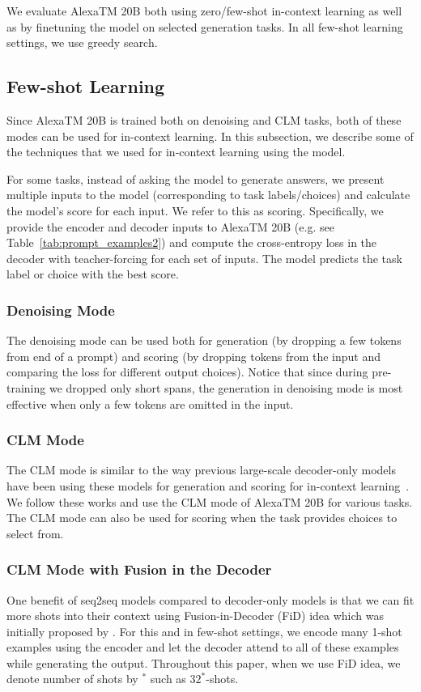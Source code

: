 We evaluate {AlexaTM 20B} both using zero/few-shot in-context learning as well as by finetuning the model on selected generation tasks. In all few-shot learning settings, we use greedy search. 
\subsection{Few-shot Learning} Since {AlexaTM 20B} is trained both on denoising and CLM tasks, both of these modes can be used for in-context learning. In this subsection, we describe some of the techniques that we used for in-context learning using the model.

For some tasks, instead of asking the model to generate answers, we present multiple inputs to the model (corresponding to task labels/choices) and calculate the model's score for each input. We refer to this as scoring. Specifically, we provide the encoder and decoder inputs to {AlexaTM 20B} (e.g. see Table~\ref{tab:prompt_examples2}) and compute the cross-entropy loss in the decoder with teacher-forcing for each set of inputs. The model predicts the task label or choice with the best score.

\subsubsection{Denoising Mode} The denoising mode can be used both for generation (by dropping a few tokens from end of a prompt) and scoring (by dropping tokens from the input and comparing the loss for different output choices). Notice that since during pre-training we dropped only short spans, the generation in denoising mode is most effective when only a few tokens are omitted in the input.
\subsubsection{CLM Mode} The CLM mode is similar to the way previous large-scale decoder-only models have been using these models for generation and scoring for in-context learning~\citep{Brown2020LanguageMA,Chowdhery2022PaLMSL,Lin2021FewshotLW}. We follow these works and use the CLM mode of {AlexaTM 20B} for various tasks. The CLM mode can also be used for scoring when the task provides choices to select from. 
\subsubsection{CLM Mode with Fusion in the Decoder} One benefit of seq2seq models compared to decoder-only models is that we can fit more shots into their context using Fusion-in-Decoder (FiD) idea which was initially proposed by \citet{Izacard2021LeveragingPR}. For this and in few-shot settings, we encode many 1-shot examples using the encoder and let the decoder attend to all of these examples while generating the output. Throughout this paper, when we use FiD idea, we denote number of shots by $^{*}$ such as $32^*$-shots. 
